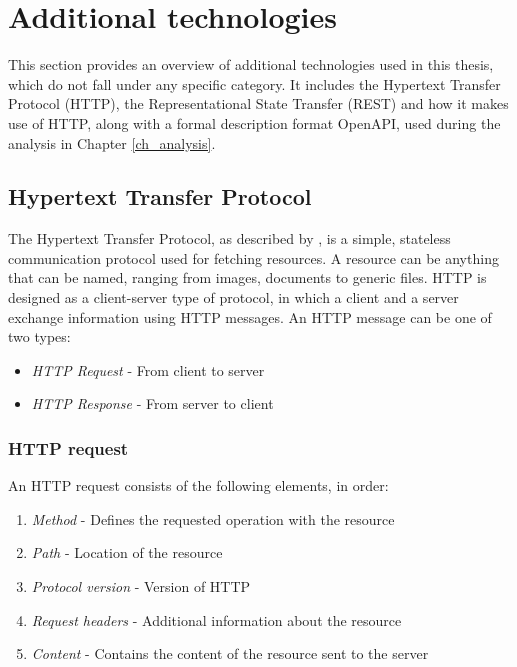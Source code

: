 \section{Additional technologies}
This section provides an overview of additional technologies used in this thesis, which do not fall under any specific category. It includes the Hypertext Transfer Protocol (HTTP), the Representational State Transfer (REST) and how it makes use of HTTP, along with a formal description format OpenAPI, used during the analysis in Chapter \ref{ch_analysis}. 

\subsection{Hypertext Transfer Protocol}
The Hypertext Transfer Protocol, as described by \cite{MozillaHTTP}, is a simple, stateless communication protocol used for fetching resources. A resource can be anything that can be named, ranging from images, documents to generic files. HTTP is designed as a client-server type of protocol, in which a client and a server exchange information using HTTP messages. An HTTP message can be one of two types:
\begin{itemize}
    \item \textit{HTTP Request} - From client to server
    \item \textit{HTTP Response} - From server to client
\end{itemize}
\subsubsection{HTTP request}
An HTTP request consists of the following elements, in order:
\begin{enumerate}
    \item \textit{Method} - Defines the requested operation with the resource
    \item \textit{Path} - Location of the resource
    \item \textit{Protocol version} - Version of HTTP
    \item \textit{Request headers} - Additional information about the resource
    \item \textit{Content} - Contains the content of the resource sent to the server
\end{enumerate}
